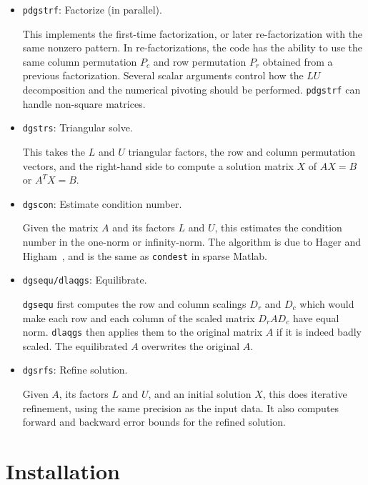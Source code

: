 \begin{itemize}
\item {\tt pdgstrf}: Factorize (in parallel).

      This implements the first-time factorization, or later re-factorization
      with the same nonzero pattern. In re-factorizations, the code
      has the ability to use the same column permutation $P_c$ and
      row permutation $P_r$ obtained from a previous factorization.
      Several scalar arguments control how the $LU$ decomposition and the 
      numerical pivoting should be performed. {\tt pdgstrf} can handle
      non-square matrices.

\item {\tt dgstrs}: Triangular solve.

      This takes the $L$ and $U$ triangular factors, the row and column 
      permutation vectors, and the right-hand side to compute a solution
      matrix $X$ of $AX=B$ or $A^TX=B$.

\item {\tt dgscon}: Estimate condition number.
      
      Given the matrix $A$ and its factors $L$ and $U$, this estimates the 
      condition number in the one-norm or infinity-norm. The algorithm is 
      due to Hager and Higham~\cite{higham96}, and is the same as 
      {\tt condest} in sparse Matlab.

\item {\tt dgsequ/dlaqgs}: Equilibrate.

      {\tt dgsequ} first computes the row and column scalings $D_r$ 
      and $D_c$ which would make each row and each column of the scaled 
      matrix $D_rAD_c$ have equal norm. 
      {\tt dlaqgs} then applies them to the original matrix $A$ if it is 
      indeed badly scaled. The equilibrated $A$ overwrites the original $A$.

\item {\tt dgsrfs}: Refine solution.

      Given $A$, its factors $L$ and $U$, and an initial solution $X$, 
      this does iterative refinement, using the same precision as the 
      input data. It also computes
      forward and backward error bounds for the refined solution.

\end{itemize}



\section{Installation}
\label{sec:mt_install}

